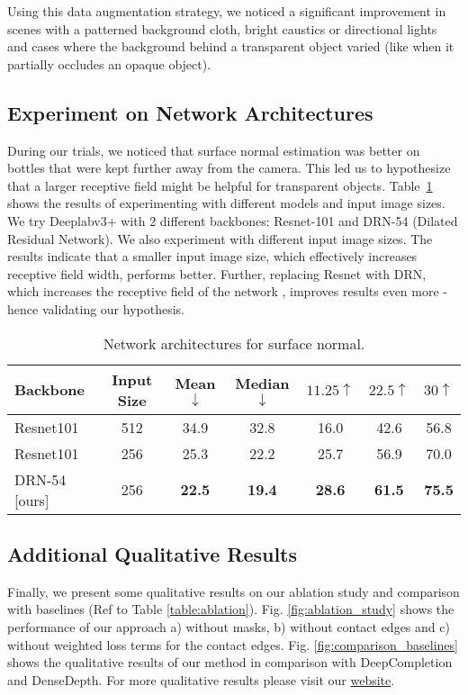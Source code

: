 \documentclass[letterpaper, 10 pt, conference]{ieeeconf}
\newcommand{\tabref}[1]{Table~\ref{#1}}
\begin{document}
Using this data augmentation strategy, we noticed a significant improvement in scenes with a patterned background cloth, bright caustics or directional lights and cases where the background behind a transparent object varied (like when it partially occludes an opaque object).


\subsection{Experiment on Network Architectures}
During our trials, we noticed that surface normal estimation was better on bottles that were kept further away from the camera. This led us to hypothesize that a larger receptive field might be helpful for transparent objects. \tabref{table:receptive_field} shows the results of experimenting with different models and input image sizes. We try Deeplabv3+ with 2 different backbones: Resnet-101 and DRN-54 (Dilated Residual Network). We also experiment with different input image sizes. The results indicate that a smaller input image size, which effectively increases receptive field width, performs better. Further, replacing Resnet with DRN, which increases the receptive field of the network \cite{Yu2017}, improves results even more - hence validating our hypothesis.

\begin{table}[ht]
    \centering
    \setlength\tabcolsep{3px}
    \begin{tabular}{l|c|ccccc}
        \toprule
        Backbone & Input Size & Mean$\downarrow$ & Median$\downarrow$ & $11.25\uparrow$ & $22.5\uparrow$ & $30\uparrow$ \\
        \midrule
        Resnet101  & 512 & 34.9 & 32.8 & 16.0 & 42.6 & 56.8 \\
        Resnet101  & 256 & 25.3 & 22.2 & 25.7 & 56.9 & 70.0 \\
        DRN-54 [ours] & 256 & \textbf{22.5 }& \textbf{19.4} & \textbf{28.6} & \textbf{61.5} & \textbf{ 75.5 }\\
        \bottomrule 
    \end{tabular}
    \caption{Network architectures for surface normal.}
    \label{table:receptive_field}
\end{table}

\subsection{Additional Qualitative Results}
Finally, we present some qualitative results on our ablation study and comparison with baselines (Ref to Table \ref{table:ablation}). 
Fig. \ref{fig:ablation_study} shows the performance of our approach a) without masks, b) without contact edges and c) without weighted loss terms for the contact edges.
Fig. \ref{fig:comparison_baselines} shows the qualitative results of our method in comparison with DeepCompletion and DenseDepth.
For more qualitative results please visit our \href{https://sites.google.com/view/cleargrasp}{website}. 
\end{document}
